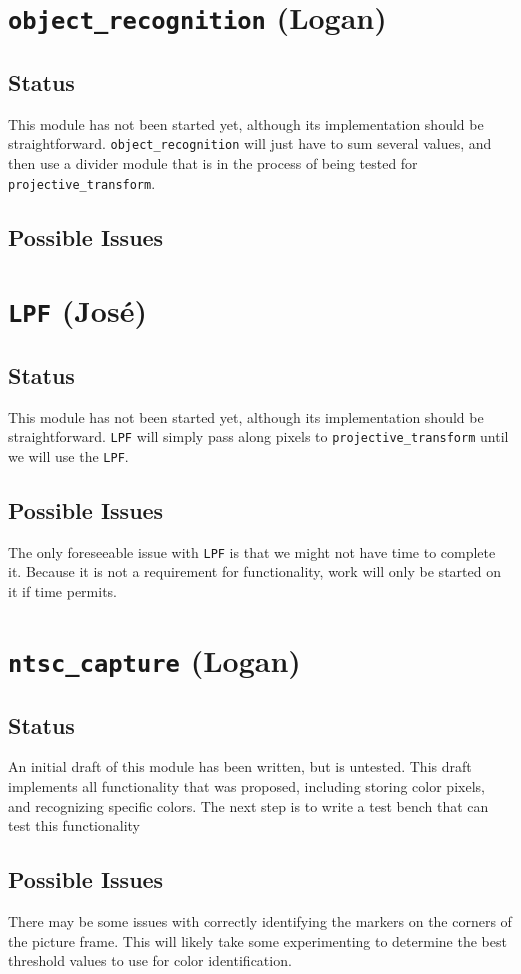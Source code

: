 \documentclass{article}
\begin{document}
\section{{\tt object\_recognition} (Logan)}
\subsection{Status} This module has not been started yet, although its implementation should be straightforward. {\tt object\_recognition} will just have to sum several values, and then use a divider module that is in the process of being tested for {\tt projective\_transform}.
\subsection{Possible Issues}

\section{{\tt LPF} (Jos\'{e})}
\subsection{Status} This module has not been started yet, although its implementation should be straightforward. {\tt LPF} will simply pass along pixels to {\tt projective\_transform} until we will use the {\tt LPF}.
\subsection{Possible Issues} The only foreseeable issue with {\tt LPF} is that we might not have time to complete it. Because it is not a requirement for functionality, work will only be started on it if time permits.

\section{{\tt ntsc\_capture} (Logan)}
\subsection{Status} An initial draft of this module has been written, but is untested. This draft implements all functionality that was proposed, including storing color pixels, and recognizing specific colors. The next step is to write a test bench that can test this functionality
\subsection{Possible Issues} There may be some issues with correctly identifying the markers on the corners of the picture frame. This will likely take some experimenting to determine the best threshold values to use for color identification.
\end{document}
